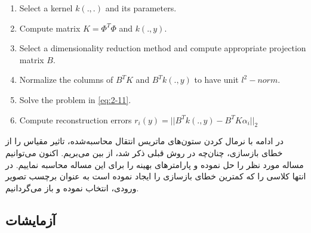 \documentclass[12pt,twocolumn]{article}
\begin{document}
\begin{latin}
\begin{algorithm}
 \begin{enumerate}
 \item Select a kernel $k(.,.)$ and its parameters.
 \item Compute matrix $K = \Phi^T\Phi$ and $k(.,y)$. 
 \item Select a dimensionality reduction method and compute appropriate projection matrix $B$.
 \item Normalize the columns of $B^TK$ and $B^Tk(.,y)$ to have unit $l^2-norm$.
 \item Solve the problem in \eqref{eq:2-11}.
 \item Compute reconstruction errors $r_i(y) = ||B^Tk(.,y) - B^TK\alpha_i||_2$
 \end{enumerate}
 
 \caption{ \cite{zhang2012kernel}}
 \label{alg:2}
\end{algorithm}
\end{latin}


در ادامه با نرمال کردن ستون‌های ماتریس انتقال محاسبه‌شده، تاثیر مقیاس را از خطای بازسازی، چنان‌چه در روش قبلی ذکر شد، از بین می‌بریم. اکنون می‌توانیم مساله مورد نظر را حل نموده و پارامترهای بهینه را برای این مساله محاسبه نماییم. در انتها کلاسی را که کمترین خطای بازسازی را ایجاد نموده است به عنوان برچسب تصویر ورودی، انتخاب نموده و باز می‌گردانیم.

\subsection{آزمایشات}
\end{document}
